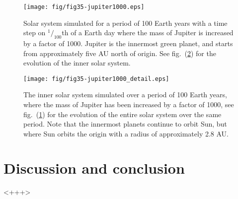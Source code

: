 \documentclass[a4paper,11pt]{article}
\begin{document}
\begin{figure}[hbt]
    \centering
    \texttt{[image: fig/fig35-jupiter1000.eps]}
    \caption{Solar system simulated for a period of 100 Earth years with a time step on $^1\!/_{100}$th of a Earth day where the mass of Jupiter is increased by a factor of 1000. Jupiter is the innermost green planet, and starts from approximately five AU north of origin. See fig.~(\ref{fig:35b}) for the evolution of the inner solar system.}
    \label{fig:35}
\end{figure}

\begin{figure}[htb]
    \centering
    \texttt{[image: fig/fig35-jupiter1000\_detail.eps]}
    \caption{The inner solar system simulated over a period of 100 Earth years, where the mass of Jupiter has been increased by a factor of 1000, see fig.~(\ref{fig:35}) for the evolution of the entire solar system over the same period. Note that the innermost planets continue to orbit Sun, but where Sun orbits the origin with a radius of approximately 2.8 AU.}
    \label{fig:35b}
\end{figure}

\section{Discussion and conclusion}<+++>



\end{document}
